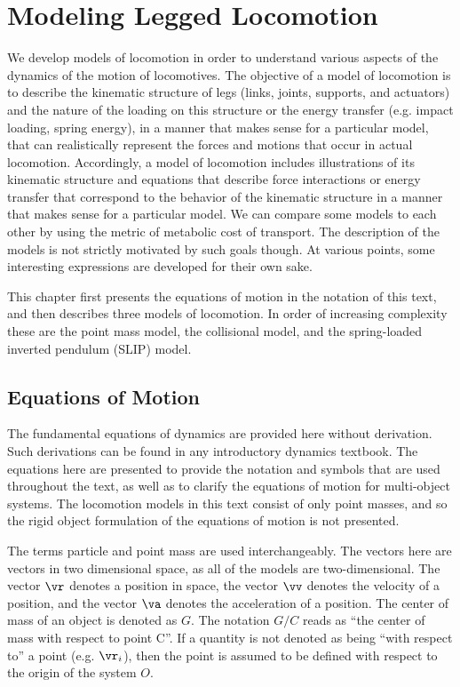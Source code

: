 \chapter{Modeling Legged Locomotion}
\label{sec:ModelingLeggedLocomotion}

We develop models of locomotion in order to understand various aspects of the dynamics of the motion of locomotives. The objective of a model of locomotion is to describe the kinematic structure of legs (links, joints, supports, and actuators) and the nature of the loading on this structure or the energy transfer (e.g. impact loading, spring energy), in a manner that makes sense for a particular model, that can realistically represent the forces and motions that occur in actual locomotion. Accordingly, a model of locomotion includes illustrations of its kinematic structure and equations that describe force interactions or energy transfer that correspond to the behavior of the kinematic structure in a manner that makes sense for a particular model. We can compare some models to each other by using the metric of metabolic cost of transport. The description of the models is not strictly motivated by such goals though. At various points, some interesting expressions are developed for their own sake.

This chapter first presents the equations of motion in the notation of this text, and then describes three models of locomotion. In order of increasing complexity these are the point mass model, the collisional model, and the spring-loaded inverted pendulum (SLIP) model.

\section{Equations of Motion} %
\label{sec:EquationsOfMotion}

The fundamental equations of dynamics are provided here without derivation. Such derivations can be found in any introductory dynamics textbook. The equations here are presented to provide the notation and symbols that are used throughout the text, as well as to clarify the equations of motion for multi-object systems. The locomotion models in this text consist of only point masses, and so the rigid object formulation of the equations of motion is not presented.

The terms particle and point mass are used interchangeably. The vectors here are vectors in two dimensional space, as all of the models are two-dimensional. The vector $\vr$ denotes a position in space, the vector $\vv$ denotes the velocity of a position, and the vector $\va$ denotes the acceleration of a position. The center of mass of an object is denoted as $G$. The notation $G/C$ reads as ``the center of mass with respect to point C''. If a quantity is not denoted as being ``with respect to'' a point (e.g. $\vr_{i}$), then the point is assumed to be defined with respect to the origin of the system $O$.

